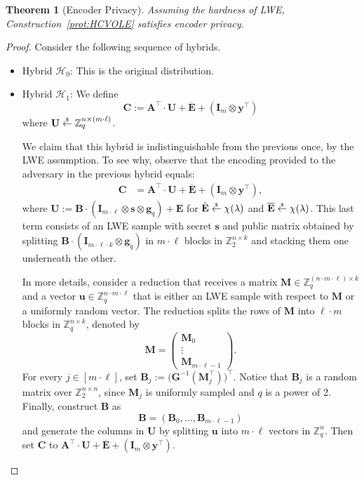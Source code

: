 \documentclass{article}
\newtheorem{theorem}{Theorem}\newtheorem{lemma}[theorem]{Lemma}\newtheorem{proposition}[theorem]{Proposition}\newtheorem{corollary}[theorem]{Corollary}\newtheorem{definition}[theorem]{Definition}\newtheorem{claim}[theorem]{Claim}
\newcommand{\getsr}{\overset{\raisebox{-1pt}{$\scriptscriptstyle \$$}}{\gets}}
\newcommand{\sample}{\getsr}
\newcommand{\Z}{\mathbb{Z}}
\renewcommand{\sec}{\ensuremath{\lambda}}
\newcommand{\id}{\ensuremath{\mathbf{I}}}
\begin{document}
\begin{theorem}[Encoder Privacy]
    Assuming the hardness of LWE, Construction~\ref{prot:HCVOLE} satisfies encoder privacy.
\end{theorem}
\begin{proof}
    Consider the following sequence of hybrids.
    \begin{itemize}
        \item Hybrid $\mathcal{H}_0$: This is the original distribution.
        \item Hybrid $\mathcal{H}_1$: We define 
        \[
        \mathbf{C} := \mathbf{A}^\intercal \cdot \mathbf{U}+\overline{\mathbf{E}}+(\id_{m}\otimes \mathbf{y}^\intercal)
        \]
        where $\mathbf{U}\sample\Z_q^{n\times (m\cdot \ell)}$.

        We claim that this hybrid is indistinguishable from the previous once, by the LWE assumption. To see why, observe that the encoding provided to the adversary in the previous hybrid equals:
    \begin{align*}\mathbf{C}&=\mathbf{A}^\intercal \cdot \mathbf{U}+\overline{\mathbf{E}}+(\id_{m}\otimes \mathbf{y}^\intercal),
\end{align*}
where $\mathbf{U}:=\mathbf{B}\cdot (\id_{m\cdot \ell}\otimes \mathbf{s}\otimes\mathbf{g}_q)+ \hat{\mathbf{E}}$ for $\hat{\mathbf{E}}\sample{\chi}(\sec)$ and $\overline{\mathbf{E}}\sample\chi(\sec)$. This last term consists of an LWE sample with secret $\mathbf{s}$ and public matrix obtained by splitting $\mathbf{B}\cdot(\id_{m\cdot \ell\cdot k}\otimes \mathbf{g}_q)$ in $m\cdot \ell$ blocks in $\Z_2^{n\times k}$ and stacking them one underneath the other. 

    In more details, consider a reduction that receives a matrix $\mathbf{M}\in\Z_q^{( n\cdot m\cdot \ell)\times k}$ and a vector $\mathbf{u}\in\Z_q^{n\cdot m\cdot \ell}$ that is either an LWE sample with respect to $\mathbf{M}$ or a uniformly random vector. The reduction splits the rows of $\mathbf{M}$ into $\ell\cdot m$ blocks in $\Z_q^{n\times k}$, denoted by
    \[
    \mathbf{M} = \begin{pmatrix}   
    \mathbf{M}_0\\
    \vdots\\
    \mathbf{M}_{m\cdot \ell-1}
    \end{pmatrix}.
    \]
    For every $j\in[m\cdot \ell]$, set $\mathbf{B}_j:= \bigl(\mathbf{G}^{-1}(\mathbf{M}_j^\intercal)\bigr)^\intercal$. Notice that $\mathbf{B}_j$ is a random matrix over $\Z_2^{n\times n}$, since $\mathbf{M}_j$ is uniformly sampled and $q$ is a power of 2. Finally, construct $\mathbf{B}$ as 
    \[
    \mathbf{B} = (\mathbf{B}_0, \dots, \mathbf{B}_{m\cdot\ell -1})
    \]
    and generate the columns in $\mathbf{U}$ by splitting $\mathbf{u}$ into $m\cdot \ell$ vectors in $\Z_q^n$. Then set $\mathbf{C}$ to $\mathbf{A}^\intercal \cdot \mathbf{U}+\overline{\mathbf{E}}+(\id_{m}\otimes \mathbf{y}^\intercal)$.



\end{itemize}
\end{proof}
\end{document}
